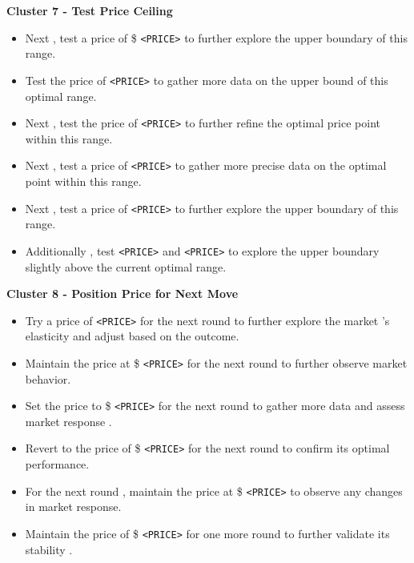 \textbf{Cluster 7 - Test Price Ceiling}
\begin{itemize}
    \item Next , test a price of \$ \texttt{<PRICE>} to further explore the upper boundary of this range.
    \item Test the price of \texttt{<PRICE>} to gather more data on the upper bound of this optimal range.
    \item Next , test the price of \texttt{<PRICE>} to further refine the optimal price point within this range.
    \item Next , test a price of \texttt{<PRICE>} to gather more precise data on the optimal point within this range.
    \item Next , test a price of \texttt{<PRICE>} to further explore the upper boundary of this range.
    \item Additionally , test \texttt{<PRICE>} and \texttt{<PRICE>} to explore the upper boundary slightly above the current optimal range.
\end{itemize}

\textbf{Cluster 8 - Position Price for Next Move}
\begin{itemize}
    \item Try a price of \texttt{<PRICE>} for the next round to further explore the market 's elasticity and adjust based on the outcome.
    \item Maintain the price at \$ \texttt{<PRICE>} for the next round to further observe market behavior.
    \item Set the price to \$ \texttt{<PRICE>} for the next round to gather more data and assess market response .
    \item Revert to the price of \$ \texttt{<PRICE>} for the next round to confirm its optimal performance.
    \item For the next round , maintain the price at \$ \texttt{<PRICE>} to observe any changes in market response.
    \item Maintain the price of \$ \texttt{<PRICE>} for one more round to further validate its stability .
\end{itemize}

